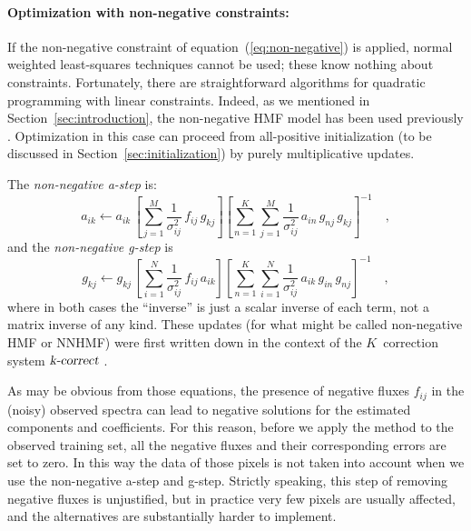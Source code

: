 \documentclass[12pt,preprint]{aastex}
\newcommand{\sectionname}{Section}
\newcommand{\equationname}{equation}
\begin{document}
\paragraph{Optimization with non-negative constraints:}

If the non-negative constraint of
\equationname~(\ref{eq:non-negative}) is applied, normal weighted
least-squares techniques cannot be used; these know nothing about
constraints.  Fortunately, there are straightforward algorithms for
quadratic programming with linear constraints.  Indeed, as we
mentioned in \sectionname~\ref{sec:introduction}, the non-negative HMF
model has been used previously \citep{blanton}.  Optimization in this
case can proceed from all-positive initialization (to be discussed in
\sectionname~\ref{sec:initialization}) by purely multiplicative
updates.

The \emph{non-negative a-step} is:
\begin{equation}\label{eq:astep_nonneg}
a_{ik} \gets a_{ik}\,\left[\sum_{j=1}^{M}\frac{1}{\sigma^2_{ij}}\,f_{ij}\,g_{kj}\right]\left[\sum_{n=1}^{K}\sum_{j=1}^{M}\frac{1}{\sigma^2_{ij}}\,a_{in}\,g_{nj}\,g_{kj}\right]^{-1}
\quad ,
\end{equation}
and the \emph{non-negative g-step} is
\begin{equation}\label{eq:gstep_nonneg}
g_{kj} \gets g_{kj}\,\left[\sum_{i=1}^{N}\frac{1}{\sigma^2_{ij}}\,f_{ij}\,a_{ik}\right]\left[\sum_{n=1}^{K}\sum_{i=1}^{N}\frac{1}{\sigma^2_{ij}}\,a_{ik}\,g_{in}\,g_{nj}\right]^{-1}
\quad ,
\end{equation}
where in both cases the ``inverse'' is just a scalar inverse of each
term, not a matrix inverse of any kind.  These updates (for what might
be called non-negative HMF or NNHMF) were first written down in the
context of the $K$~correction system $\textsl{k-correct}$
\citep{blanton}.

As may be obvious from those equations, the presence of negative
fluxes $f_{ij}$ in the (noisy) observed spectra can lead to negative
solutions for the estimated components and coefficients. For this
reason, before we apply the method to the observed training set, all
the negative fluxes and their corresponding errors are set to zero. In
this way the data of those pixels is not taken into account when we
use the non-negative a-step and g-step.  Strictly speaking, this step
of removing negative fluxes is unjustified, but in practice very few
pixels are usually affected, and the alternatives are substantially
harder to implement.
\end{document}
